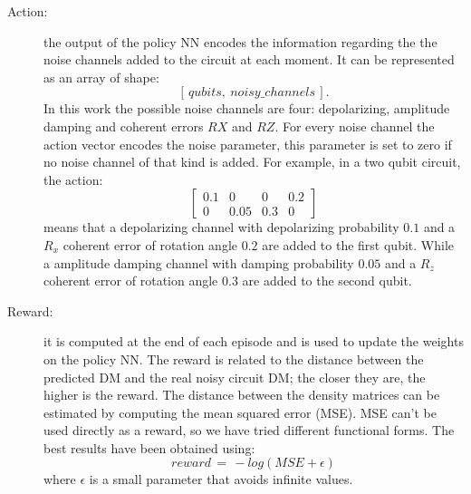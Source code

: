\documentclass[sn-basic]{sn-jnl} %
\begin{document}
\begin{description}
    \item[Action:] the output of the policy NN encodes the information regarding the the noise channels added to the circuit at each moment. It can be represented as an array of shape:
    $$[\,qubits, \: noisy\_channels\,].$$
    In this work the possible noise channels are four: depolarizing, amplitude damping and coherent errors $RX$ and $RZ$. For every noise channel the action vector encodes the noise parameter, this parameter is set to zero if no noise channel of that kind is added. For example, in a two qubit circuit, the action:
    \begin{equation*}
    \left[\begin{array}{cccc}
    0.1 & 0 & 0 & 0.2 \\
    0 & 0.05 & 0.3 & 0
    \end{array} \right]
    \end{equation*}
    means that a depolarizing channel with depolarizing probability $0.1$ and a $R_x$ coherent error of rotation angle $0.2$ are added to the first qubit. While a amplitude damping channel with damping probability $0.05$ and a $R_z$ coherent error of rotation angle $0.3$ are added to the second qubit.

    \item[Reward:] it is computed at the end of each episode and is used to update the weights on the policy NN. The reward is related to the distance between the predicted DM and the real noisy circuit DM; the closer they are, the higher is the reward. The distance between the density matrices can be estimated by computing the mean squared error (MSE). MSE can't be used directly as a reward, so we have tried different functional forms. The best results have been obtained using:
    $$reward \,= \,-log(MSE+\epsilon)$$
    where $\epsilon$ is a small parameter that avoids infinite values.
\end{description}


\end{document}
